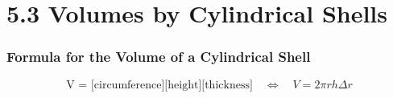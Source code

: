 %
%

\section*{5.3 Volumes by Cylindrical Shells}

\subsubsection*{Formula for the Volume of a Cylindrical Shell}

\[ \text{V = [circumference][height][thickness]} \quad \Leftrightarrow \quad V = 2 \pi rh \Delta r \]

